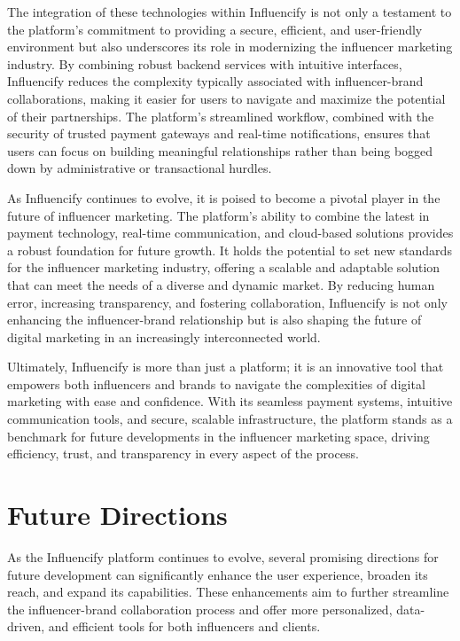\begin{justify}
The integration of these technologies within Influencify is not only a testament to the platform’s commitment to providing a secure, efficient, and user-friendly environment but also underscores its role in modernizing the influencer marketing industry. By combining robust backend services with intuitive interfaces, Influencify reduces the complexity typically associated with influencer-brand collaborations, making it easier for users to navigate and maximize the potential of their partnerships. The platform’s streamlined workflow, combined with the security of trusted payment gateways and real-time notifications, ensures that users can focus on building meaningful relationships rather than being bogged down by administrative or transactional hurdles.

As Influencify continues to evolve, it is poised to become a pivotal player in the future of influencer marketing. The platform’s ability to combine the latest in payment technology, real-time communication, and cloud-based solutions provides a robust foundation for future growth. It holds the potential to set new standards for the influencer marketing industry, offering a scalable and adaptable solution that can meet the needs of a diverse and dynamic market. By reducing human error, increasing transparency, and fostering collaboration, Influencify is not only enhancing the influencer-brand relationship but is also shaping the future of digital marketing in an increasingly interconnected world.

Ultimately, Influencify is more than just a platform; it is an innovative tool that empowers both influencers and brands to navigate the complexities of digital marketing with ease and confidence. With its seamless payment systems, intuitive communication tools, and secure, scalable infrastructure, the platform stands as a benchmark for future developments in the influencer marketing space, driving efficiency, trust, and transparency in every aspect of the process.
\section{Future Directions}

As the Influencify platform continues to evolve, several promising directions for future development can significantly enhance the user experience, broaden its reach, and expand its capabilities. These enhancements aim to further streamline the influencer-brand collaboration process and offer more personalized, data-driven, and efficient tools for both influencers and clients.


\end{justify}

